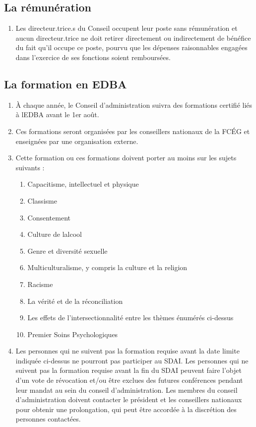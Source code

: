 \subsection{La rémunération}
\label{la-remuneration}

\begin{enumerate}
 \item
  Les directeur.trice.s du Conseil occupent leur poste sans rémunération et aucun directeur.trice ne doit retirer directement ou indirectement de bénéfice du fait qu'il occupe ce poste, pourvu que les dépenses raisonnables engagées dans l'exercice de ses fonctions soient remboursées.
\end{enumerate}

\subsection{La formation en EDBA}
\label{la-formation-en-edba}

\begin{enumerate}
 \item
  À chaque année, le Conseil d'administration suivra des formations certifié liés à l\textquotesingle EDBA avant le 1er août.
 \item
  Ces formations seront organisées par les conseillers nationaux de la FCÉG et enseignées par une organisation externe.
 \item
  Cette formation ou ces formations doivent porter au moins sur les sujets suivants :
  \begin{enumerate}
   \item
    Capacitisme, intellectuel et physique
   \item
    Classisme
   \item
    Consentement
   \item
    Culture de l\textquotesingle alcool
   \item
    Genre et diversité sexuelle
   \item
    Multiculturalisme, y compris la culture et la religion
   \item
    Racisme
   \item
    La vérité et de la réconciliation
   \item
    Les effets de l'intersectionnalité entre les thèmes énumérés ci-dessus
   \item
    Premier Soins Psychologiques
  \end{enumerate}
 \item
  Les personnes qui ne suivent pas la formation requise avant la date limite indiquée ci-dessus ne pourront pas participer au SDAI. Les personnes qui ne suivent pas la formation requise avant la fin du SDAI peuvent faire l'objet d'un vote de révocation et/ou être exclues des futures conférences pendant leur mandat au sein du conseil d'administration. Les membres du conseil d'administration doivent contacter le président et les conseillers nationaux pour obtenir une prolongation, qui peut être accordée à la discrétion des personnes contactées.
\end{enumerate}


